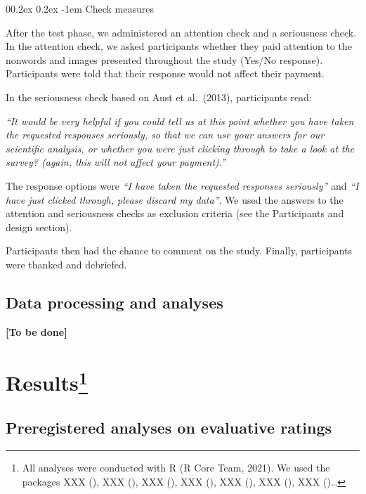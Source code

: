 \documentclass[
  man,floatsintext]{apa6}
\makeatletter
\let\oldparagraph\paragraph
\renewcommand{\paragraph}[1]{\oldparagraph{#1}\mbox{}}
\renewcommand{\paragraph}{\@startsection{paragraph}{4}{\parindent}%
  {0\baselineskip \@plus 0.2ex \@minus 0.2ex}%
  {-1em}%
  {\normalfont\normalsize\bfseries\itshape\typesectitle}}
\makeatother
\begin{document}
\hypertarget{check-measures}{%
\paragraph{Check measures}\label{check-measures}}

After the test phase, we administered an attention check and a seriousness check. In the attention check, we asked participants whether they paid attention to the nonwords and images presented throughout the study (Yes/No response). Participants were told that their response would not affect their payment.

In the seriousness check based on Aust et al.~(2013), participants read:

\emph{``It would be very helpful if you could tell us at this point whether you have taken the requested responses seriously, so that we can use your answers for our scientific analysis, or whether you were just clicking through to take a look at the survey? (again, this will not affect your payment).''}

The response options were \emph{``I have taken the requested responses seriously''} and \emph{``I have just clicked through, please discard my data''}. We used the answers to the attention and seriousness checks as exclusion criteria (see the Participants and design section).

Participants then had the chance to comment on the study. Finally, participants were thanked and debriefed.

\hypertarget{data-processing-and-analyses}{%
\subsection{Data processing and analyses}\label{data-processing-and-analyses}}

\textbf{{[}To be done{]}}

\hypertarget{results}{%
\section[Results]{\texorpdfstring{Results\footnote{All analyses were conducted with R (R Core Team, 2021). We used the packages XXX (), XXX (), XXX (), XXX (), XXX (), XXX (), XXX ()\ldots{}}}{Results}}\label{results}}

\hypertarget{preregistered-analyses-on-evaluative-ratings}{%
\subsection{Preregistered analyses on evaluative ratings}\label{preregistered-analyses-on-evaluative-ratings}}
\end{document}
